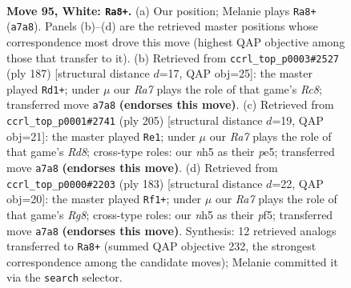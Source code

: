\documentclass[11pt]{article}
\begin{document}
\clearpage

\begin{figure}[p]\centering
\begin{subfigure}{0.46\textwidth}\centering
\resizebox{\linewidth}{!}{%
\newchessgame
\chessboard[
  setfen={4k3/R7/8/7n/p6r/P7/7p/7K w - - 16 95},
  showmover=false,
  pgfstyle=straightmove, color=movearrow, markmove={a7-a8}
]}
\caption{}
\end{subfigure}\hfill
\begin{subfigure}{0.46\textwidth}\centering
\resizebox{\linewidth}{!}{%
\newchessgame
\chessboard[
  setfen={8/k7/P7/R1P5/3K4/8/8/2r5 b - - 28 94},
  showmover=false,
  pgfstyle=straightmove, color=movearrow, markmove={c1-d1}
]}
\caption{}
\end{subfigure}
\\[4pt]
\begin{subfigure}{0.46\textwidth}\centering
\resizebox{\linewidth}{!}{%
\newchessgame
\chessboard[
  setfen={8/6k1/4R1P1/2K1P3/8/8/8/3r4 b - - 8 103},
  showmover=false,
  pgfstyle=straightmove, color=movearrow, markmove={d1-e1}
]}
\caption{}
\end{subfigure}\hfill
\begin{subfigure}{0.46\textwidth}\centering
\resizebox{\linewidth}{!}{%
\newchessgame
\chessboard[
  setfen={8/7k/7P/5P2/8/5K1R/8/6r1 b - - 0 92},
  showmover=false,
  pgfstyle=straightmove, color=movearrow, markmove={g1-f1}
]}
\caption{}
\end{subfigure}
\caption{\textbf{Move 95, White: \texttt{Ra8+}.} (a) Our position; Melanie plays \texttt{Ra8+} (\texttt{a7a8}). Panels (b)--(d) are the retrieved master positions whose correspondence most drove this move (highest QAP objective among those that transfer to it). (b) Retrieved from \texttt{ccrl\_top\_p0003\#2527} (ply 187) [structural distance $d$=17, QAP obj=25]: the master played \texttt{Rd1+}; under $\mu$ our \emph{Ra7} plays the role of that game's \emph{Rc8}; transferred move \texttt{a7a8} \textbf{(endorses this move)}. (c) Retrieved from \texttt{ccrl\_top\_p0001\#2741} (ply 205) [structural distance $d$=19, QAP obj=21]: the master played \texttt{Re1}; under $\mu$ our \emph{Ra7} plays the role of that game's \emph{Rd8}; cross-type roles: our \emph{n}h5 as their \emph{p}e5; transferred move \texttt{a7a8} \textbf{(endorses this move)}. (d) Retrieved from \texttt{ccrl\_top\_p0000\#2203} (ply 183) [structural distance $d$=22, QAP obj=20]: the master played \texttt{Rf1+}; under $\mu$ our \emph{Ra7} plays the role of that game's \emph{Rg8}; cross-type roles: our \emph{n}h5 as their \emph{p}f5; transferred move \texttt{a7a8} \textbf{(endorses this move)}. Synthesis: 12 retrieved analogs transferred to \texttt{Ra8+} (summed QAP objective 232, the strongest correspondence among the candidate moves); Melanie committed it via the \texttt{search} selector.}
\label{fig:thought-m188}
\end{figure}
\end{document}
